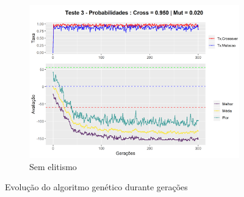 \begin{figure}[ht]
\begin{subfigure}[b]{0.47\linewidth}
		\includegraphics[width=\linewidth]{imagens/graph_pc_0_950_pm_0_020_pop_50_g_300__3_noelite.png}
		\caption{Sem elitismo}
	\end{subfigure}
	\caption{Evolução do algoritmo genético durante gerações}
	\label{fig:evolucaoGA2}
\end{figure}